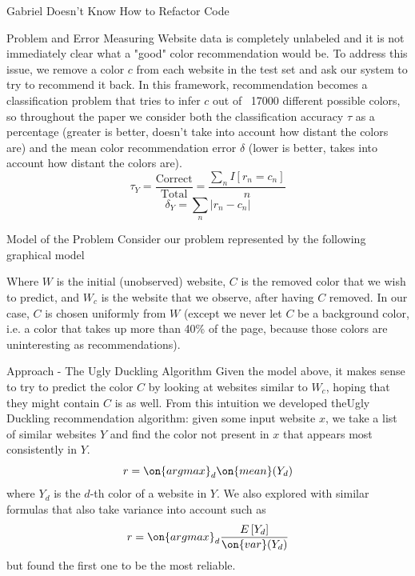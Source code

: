 \documentclass{beamer}
\begin{document}
\begin{frame}{\centerline{\Huge Gabriel Doesn't Know How to Refactor Code}}
\begin{textblock}{5}
\begin{block}{Problem and Error Measuring}
Website data is completely unlabeled and it is not immediately clear what a "good" color recommendation would be. To address this issue, we remove a color $c$ from each website in the test set and ask our system to try to recommend it back. In this framework, recommendation becomes a classification problem that tries to infer $c$ out of ~17000 different possible colors, so throughout the paper we consider both the classification accuracy $\tau$ as a percentage (greater is better, doesn't take into account how distant the colors are) and the mean color recommendation error $\delta$ (lower is better, takes into account how distant the colors are).
$$\tau_Y = \frac{\text{Correct}}{\text{Total}} = \frac{\sum_n I[r_n = c_n]}{n}$$
$$\delta_Y = \sum_n |r_n - c_n|$$
\end{block}

\begin{block}{Model of the Problem}
Consider our problem represented by the following graphical model
\begin{figure}
\centering
{}
\end{figure}
Where $W$ is the initial (unobserved) website, $C$ is the removed color that we wish to predict, and $W_c$ is the website
that we observe, after having $C$ removed. In our case, $C$ is chosen uniformly from $W$ (except we never let $C$ be a
background color, i.e. a color that takes up more than 40\% of the page, because those colors are uninteresting as
recommendations).
\end{block}


\begin{block}{Approach - The Ugly Duckling Algorithm}
Given the model above, it makes sense to try to predict the color $C$ by looking at websites similar to $W_c$, hoping
that they might contain $C$ is as well. From this intuition we developed theUgly Duckling recommendation algorithm: given some input website $x$, we take a list of similar websites $Y$ and find the color not present in $x$ that appears most consistently in $Y$.
$$r = \on{argmax}_{d} \on{mean}(Y_d) $$
where $Y_d$ is the $d$-th color of a website in $Y$. We also explored with similar formulas that also take variance into account such as
$$r = \on{argmax}_{d} \frac{E\left[Y_d\right]}{\on{var}(Y_d)} $$
but found the first one to be the most reliable.


\end{block}
\end{textblock}
\end{frame}
\end{document}
